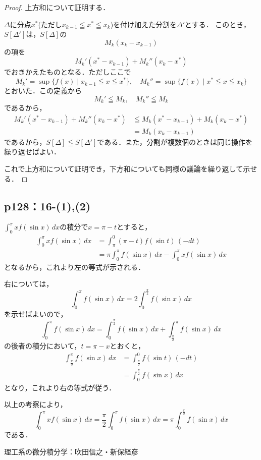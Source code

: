 \documentclass[uplatex,dvipdfmx,a4paper,10pt,fleqn]{jsarticle}
\begin{document}
\begin{tleftbar}
  \begin{proof}
  上方和について証明する．

  $\varDelta$に分点$x^{\ast}$(ただし$ x_{k-1} \leqq x^{\ast} \leqq x_{k}$)を付け加えた分割を$\varDelta '$とする．
  このとき，$ S[\varDelta ']$は，$S[\varDelta]$の
  \[
    M_k (x_k-x_{k-1})
  \]
    の項を
  \[
  M_k' (x^{\ast}-x_{k-1})+M_k ''(x_k - x^{\ast})
  \]
  でおきかえたものとなる．ただしここで
  \[
    M_k ' = \sup \{ f(x) \mid x_{k-1} \leqq x \leqq x^{\ast} \} , \quad M_k '' = \sup \{ f(x) \mid x^\ast \leqq x \leqq x_k \}
  \]
  とおいた．この定義から
  \[
    M_k ' \leqq M_k ,\quad M_k '' \leqq M_k
  \]
  であるから，
  \begin{align*}
    M_k' (x^{\ast}-x_{k-1})+M_k ''(x_k - x^{\ast}) & \leqq M_k (x^{\ast}-x_{k-1})+M_k (x_k - x^{\ast}) \\
    & = M_k(x_k-x_{k-1})
  \end{align*}
  であるから，$S [\varDelta] \leqq S[ \varDelta']$である．また，分割が複数個のときは同じ操作を繰り返せばよい．
  
  これで上方和について証明でき，下方和についても同様の議論を繰り返して示せる．
\end{proof}
\end{tleftbar}

\newpage 

\subsection*{p128：16-(1),(2)}

$\int_{0}^{\pi} x f(\sin x)\, dx $の積分で$x= \pi -t $とすると，
\begin{align*} 
    \int_{0}^{\pi} x f( \sin x) \, dx & = \int_{\pi}^{0} (\pi - t) f(\sin t )\, ( -dt) \\
    & = \pi \int_{0}^{\pi} f(\sin x) \, dx - \int_{0}^{\pi} x f (\sin x)\, dx 
\end{align*} 
となるから，これより左の等式が示される．

右については，
\[
    \int_{0}^{\pi} f(\sin x)\, dx =2 \int_{0}^{\frac{\pi}{2}} f(\sin x) \, dx 
\]
を示せばよいので，
\[
    \int_{0}^{\pi} f(\sin x)\, dx = \int_{0}^{\frac{\pi}{2}} f(\sin x) \, dx + \int_{\frac{\pi}{2}}^{\pi} f(\sin x)\, dx 
\]
の後者の積分において，$ t = \pi -x$とおくと，
\begin{align*}
    \int_{\frac{\pi}{2}}^{\pi} f(\sin x)\, dx &= \int_{\frac{\pi}{2}}^{0} f (\sin t)\, (-dt) \\
    & = \int_{0}^{\frac{\pi}{2}} f (\sin x)\, dx
\end{align*}
となり，これより右の等式が従う．

以上の考察により，
\[
    \int_{0}^{\pi}x f(\sin x)\, dx=\frac{\pi}{2} \int_{0}^{\pi} f(\sin x)\, dx =\pi \int_{0}^{\frac{\pi}{2}} f(\sin x) \, dx 
\]
である．

\begin{thebibliography}{9}
	 理工系の微分積分学：吹田信之・新保経彦
\end{thebibliography}
\end{document}
